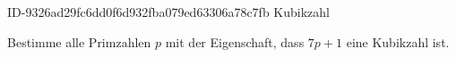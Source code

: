 \begin{exercise}
      {ID-9326ad29fc6dd0f6d932fba079ed63306a78c7fb}
      {Kubikzahl}
  \ifproblem\problem\par
    Bestimme alle Primzahlen $p$ mit der Eigenschaft, dass $7p+1$ eine
    Kubikzahl ist.
  \fi
\end{exercise}
